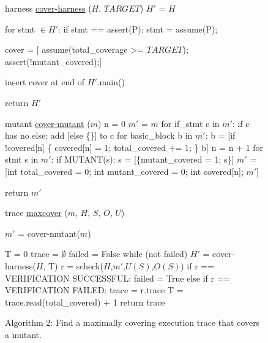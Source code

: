 \documentclass{svjour3}
\begin{document}
\begin{figure}
{\scriptsize 
\begin{code}
harness {\underline{cover-harness}} ($H$, $TARGET$) 
\vspace{0.1in}
  $H'$ = $H$

  for stmt $\in H'$:
     if stmt == assert(P):
        stmt = assume(P);

  cover = [
    assume(total\_coverage >= $TARGET$); 
    assert(!mutant\_covered);]

  insert cover at end of $H'$.main() 

  return $H'$
\end{code}

\vspace{0.2in}

\begin{code}
mutant {\underline{cover-mutant}} ($m$) 
\vspace{0.1in}
  n = 0
  $m'$ = $m$
  for if\_stmt c in $m'$:
     if c has no else:
        add [else \{\}] to c
  for basic\_block b in $m'$:
     b = [if !covered[n] \{
             covered[n] = 1;
             total\_covered += 1;
          \}
          b]
     n = n + 1
  for stmt s in $m'$:
     if MUTANT(s):
        s = [\{mutant\_covered = 1;
              s\}]
  $m'$ = [int total\_covered = 0;
        int mutant\_covered = 0;
        int covered[n];
        $m'$]

  return $m'$
\end{code}

\vspace{0.2in}

\begin{code}
trace {\underline{maxcover}} ($m$, $H$, $S$, $O$, $U$) 
\vspace{0.1in}

  $m'$ = cover-mutant($m$)

  T = 0
  trace = $\emptyset$
  failed = False
  while (not failed)
     $H'$ = cover-harness($H$, T)
     r = scheck($H$,$m'$,$U(S)$,$O(S)$)
     if r == VERIFICATION SUCCESSFUL:
       failed = True
     else if r == VERIFICATION FAILED:
       trace = r.trace
       T = trace.read(total\_covered) + 1
  return trace
\end{code}
}
\caption{Algorithm 2: Find a maximally covering execution trace that
  covers a mutant.}
\label{alg:maxcover}
\end{figure}
\end{document}
